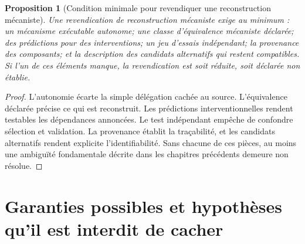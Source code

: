 \documentclass[11pt,oneside]{book}
\newtheorem{proposition}[theoreme]{Proposition}
\theoremstyle{definition}
\theoremstyle{remark}
\newcommand{\1}{\mathbf 1}
\begin{document}
\begin{proposition}[Condition minimale pour revendiquer une reconstruction mécaniste]
Une revendication de reconstruction mécaniste exige au minimum : un mécanisme exécutable autonome; une classe d'équivalence mécaniste déclarée; des prédictions pour des interventions; un jeu d'essais indépendant; la provenance des composants; et la description des candidats alternatifs qui restent compatibles. Si l'un de ces éléments manque, la revendication est soit réduite, soit déclarée non établie.
\end{proposition}
\begin{proof}
L'autonomie écarte la simple délégation cachée au source. L'équivalence déclarée précise ce qui est reconstruit. Les prédictions interventionnelles rendent testables les dépendances annoncées. Le test indépendant empêche de confondre sélection et validation. La provenance établit la traçabilité, et les candidats alternatifs rendent explicite l'identifiabilité. Sans chacune de ces pièces, au moins une ambiguïté fondamentale décrite dans les chapitres précédents demeure non résolue.\end{proof}

\chapter{Garanties possibles et hypothèses qu'il est interdit de cacher}
\end{document}
